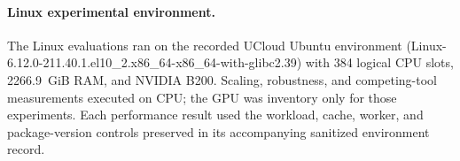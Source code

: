 \paragraph{Linux experimental environment.}
The Linux evaluations ran on the recorded UCloud Ubuntu environment (Linux-6.12.0-211.40.1.el10\_2.x86\_64-x86\_64-with-glibc2.39) with 384 logical CPU slots, 2266.9~GiB RAM, and NVIDIA B200. Scaling, robustness, and competing-tool measurements executed on CPU; the GPU was inventory only for those experiments. Each performance result used the workload, cache, worker, and package-version controls preserved in its accompanying sanitized environment record.
